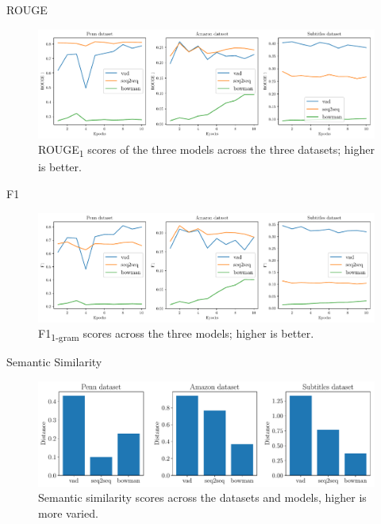 \documentclass[aspectratio=169, 11pt]{beamer}
\begin{document}
\begin{frame}{ROUGE}
  \begin{figure}[!ht]
    \centering
    \includegraphics[width=130mm]{results/rouge_1.pdf}
    \caption{ROUGE\textsubscript{1} scores of the three models across the three datasets; higher is better.\label{r:rouge}}
    \end{figure}  
\end{frame}

\begin{frame}{F1}
  \begin{figure}[!ht]
    \centering
    \includegraphics[width=130mm]{results/f1.pdf}
    \caption{F1\textsubscript{1-gram} scores across the three models; higher is better.\label{r:f1}}
    \end{figure}
\end{frame}

\begin{frame}{Semantic Similarity}
  \begin{figure}[!ht]
    \centering
    \includegraphics[width=130mm]{results/semantic_similarity.pdf}
    \caption{Semantic similarity scores across the datasets and models, higher is more varied.\label{r:variance}}
    \end{figure}
\end{frame}
\end{document}
